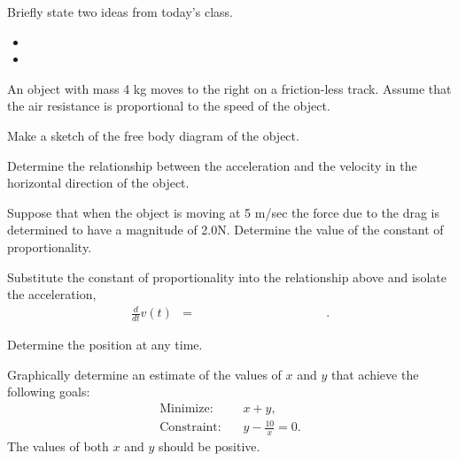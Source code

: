 \begin{problem}
\item Briefly state two ideas from today's class.
  \begin{itemize}
  \item
  \item
  \end{itemize}
\item An object with mass 4 kg moves to the right on a friction-less
  track. Assume that the air resistance is proportional to the speed
  of the object.

  \begin{subproblem}
  \item Make a sketch of the free body diagram of the object.
    \vfill

  \item Determine the relationship between the acceleration and the
    velocity in the horizontal direction of the object.

    \vfill

  \item Suppose that when the object is moving at 5 m/sec the force
    due to the drag is determined to have a magnitude of
    2.0N. Determine the value of the constant of proportionality.
    \vfill
  \item Substitute the constant of proportionality into the
    relationship above and isolate the acceleration,
    \begin{eqnarray*}
      \frac{d}{dt} v(t) & = & \hspace{10em}.
    \end{eqnarray*}
    \vfill
  \item Determine the position at any time.
    \vfill
  \end{subproblem}
\end{problem}




\begin{problem}
\item Graphically determine an estimate of the values of $x$ and $y$
  that achieve the following goals:
  \begin{eqnarray*}
    \mathrm{Minimize:}  & & x+y, \\
    \mathrm{Constraint:}  & & y - \frac{10}{x}  =  0.
  \end{eqnarray*}
  The values of both $x$ and $y$ should be positive.
  \vfill


\end{problem}


